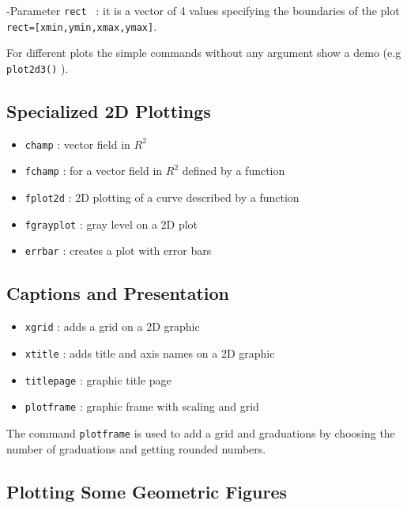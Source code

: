 -Parameter {\tt rect } : it is a vector of 4 values specifying the boundaries 
of the plot {\tt rect=[xmin,ymin,xmax,ymax]}.

For different plots the simple commands without any argument show a demo 
(e.g {\tt plot2d3()} ).

\subsection{Specialized 2D Plottings}
%
\begin{itemize}
        \item \verb+champ+	: vector field in $R^{2}$
	\item \verb+fchamp+	: for a vector field in $R^{2}$ defined by a 
function
	\item \verb+fplot2d+	: 2D plotting of a curve described by a 
function
	\item \verb+fgrayplot+	: gray level on a 2D plot
	\item \verb+errbar+	: creates a plot with error bars
\end{itemize}
%

\subsection{Captions and Presentation}
%
\begin{itemize}
	\item \verb+xgrid+	: adds a grid on a 2D graphic
	\item \verb+xtitle+	: adds	title and axis names on	a 2D graphic
	\item \verb+titlepage+	: graphic title page
	\item \verb+plotframe+	: graphic frame with scaling and grid
\end{itemize}
%

The command {\tt plotframe} is used to add a grid and graduations by choosing
the number of graduations and getting rounded numbers.



\subsection{Plotting Some Geometric Figures}

